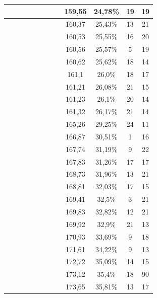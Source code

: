 \begin{center}
\begin{longtable}{|c|c|c|c|c|c|c|c|c|c|c|c|}
 \x &  &  \x &  \x &  &  &  \x &  & 159,55 & 24,78\% & 19 & 19  \\ \hline
 \x &  &  \x &  \x &  \x &  &  \x &  \x & 160,37 & 25,43\% & 13 & 21  \\ \hline
 \x &  \x &  &  \x &  \x &  \x &  &  \x & 160,53 & 25,55\% & 16 & 20  \\ \hline
 \x &  &  &  &  \x &  \x &  \x &  \x & 160,56 & 25,57\% & 5 & 19  \\ \hline
 \x &  \x &  \x &  \x &  \x &  \x &  \x &  & 160,62 & 25,62\% & 18 & 14  \\ \hline
 \x &  &  \x &  \x &  \x &  \x &  \x &  & 161,1 & 26,0\% & 18 & 17  \\ \hline
 \x &  &  &  \x &  \x &  &  &  & 161,21 & 26,08\% & 21 & 15  \\ \hline
 \x &  &  \x &  &  \x &  \x &  \x &  \x & 161,23 & 26,1\% & 20 & 14  \\ \hline
 \x &  &  \x &  &  \x &  &  \x &  & 161,32 & 26,17\% & 21 & 14  \\ \hline
 \x &  &  &  \x &  \x &  &  \x &  \x & 165,26 & 29,25\% & 24 & 11  \\ \hline
 \x &  &  &  \x &  \x &  \x &  \x &  & 166,87 & 30,51\% & 1 & 16  \\ \hline
 \x &  &  &  \x &  &  \x &  \x &  & 167,74 & 31,19\% & 9 & 22  \\ \hline
 \x &  &  &  \x &  &  &  \x &  & 167,83 & 31,26\% & 17 & 17  \\ \hline
 \x &  \x &  &  \x &  \x &  \x &  \x &  & 168,73 & 31,96\% & 13 & 21  \\ \hline
 \x &  \x &  &  \x &  \x &  &  \x &  & 168,81 & 32,03\% & 17 & 15  \\ \hline
 \x &  \x &  \x &  &  \x &  \x &  \x &  \x & 169,41 & 32,5\% & 3 & 21  \\ \hline
 \x &  \x &  \x &  \x &  \x &  &  \x &  & 169,83 & 32,82\% & 12 & 21  \\ \hline
 \x &  &  &  \x &  \x &  \x &  \x &  \x & 169,92 & 32,9\% & 21 & 13  \\ \hline
 \x &  \x &  &  \x &  &  \x &  \x &  & 170,93 & 33,69\% & 9 & 18  \\ \hline
 \x &  &  \x &  \x &  \x &  \x &  \x &  \x & 171,61 & 34,22\% & 9 & 13  \\ \hline
 \x &  &  \x &  \x &  &  \x &  \x &  & 172,72 & 35,09\% & 14 & 15  \\ \hline
 \x &  &  &  &  \x &  \x &  \x &  & 173,12 & 35,4\% & 18 & 90  \\ \hline
 \x &  &  \x &  \x &  &  \x &  \x &  \x & 173,65 & 35,81\% & 13 & 17  \\ \hline

\end{longtable}
\end{center}
